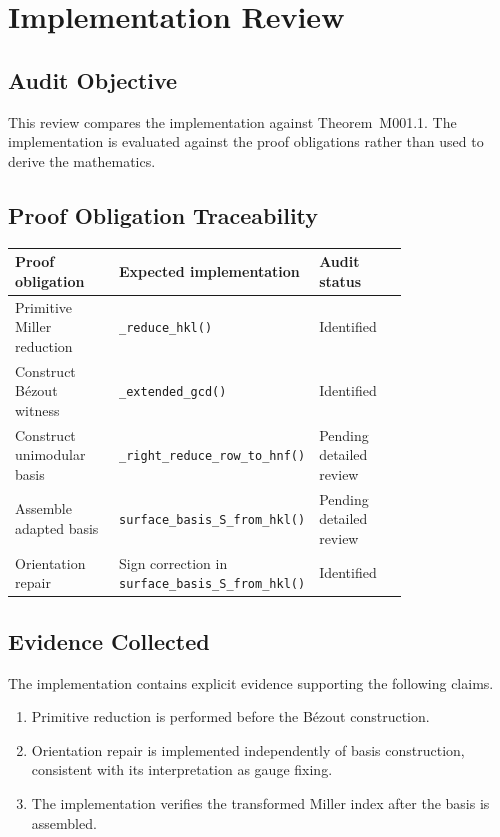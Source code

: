 
\section{Implementation Review}

\subsection{Audit Objective}

This review compares the implementation against Theorem~M001.1.
The implementation is evaluated against the proof obligations rather than
used to derive the mathematics.

\subsection{Proof Obligation Traceability}

\begin{center}
\begin{tabular}{|p{0.28\linewidth}|p{0.26\linewidth}|p{0.24\linewidth}|}
\hline
Proof obligation & Expected implementation & Audit status\\
\hline
Primitive Miller reduction &
\texttt{\_reduce\_hkl()} &
Identified\\
\hline
Construct Bézout witness &
\texttt{\_extended\_gcd()} &
Identified\\
\hline
Construct unimodular basis &
\texttt{\_right\_reduce\_row\_to\_hnf()} &
Pending detailed review\\
\hline
Assemble adapted basis &
\texttt{surface\_basis\_S\_from\_hkl()} &
Pending detailed review\\
\hline
Orientation repair &
Sign correction in
\texttt{surface\_basis\_S\_from\_hkl()} &
Identified\\
\hline
\end{tabular}
\end{center}

\subsection{Evidence Collected}

The implementation contains explicit evidence supporting the following
claims.

\begin{enumerate}
\item Primitive reduction is performed before the Bézout construction.
\item Orientation repair is implemented independently of basis
construction, consistent with its interpretation as gauge fixing.
\item The implementation verifies the transformed Miller index after the
basis is assembled.
\end{enumerate}

